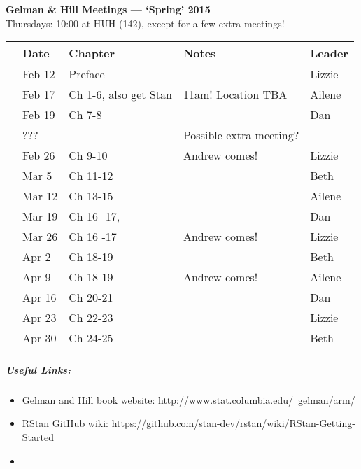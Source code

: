 \documentclass[11pt]{article}
\begin{document}
 
\raggedright
{}

\begin{center} 
{\large \textbf{Gelman \& Hill Meetings --- `Spring' 2015}} \\ [2pt]
Thursdays: 10:00 at HUH (142), except for a few extra meetings!\\
\end{center} 

\begin{center}
\begin{tabular}{ p{0.7 cm}  p{1.5 cm}  p{5 cm}  p{5 cm}  p{1.5 cm} }  \hline \hline
 & \textbf{Date}
   & \textbf{Chapter}
      & \textbf{Notes} 
         & \textbf{Leader} \\ 
\hline \hline
 & Feb 12  &  Preface&        & Lizzie \\\hline
 & Feb 17  & Ch 1-6, also get Stan   &  11am! Location TBA & Ailene  \\\hline
 & Feb 19  & Ch 7-8 &      & Dan \\\hline
 & ???  &  &  Possible extra meeting?     &  \\\hline
 & Feb 26 & Ch 9-10 &  Andrew comes! & Lizzie  \\\hline
 & Mar 5 & Ch 11-12 &        & Beth   \\\hline
 & Mar 12 & Ch 13-15 &  & Ailene \\\hline
 & Mar 19 & Ch 16 -17, &        & Dan \\\hline
 & Mar 26 & Ch 16 -17 &  Andrew comes! & Lizzie  \\\hline
 & Apr 2& Ch 18-19   &  & Beth  \\\hline
 & Apr 9 & Ch 18-19   &  Andrew comes!& Ailene  \\\hline
 & Apr 16 &Ch 20-21 &  & Dan  \\\hline
 & Apr 23 & Ch 22-23       & & Lizzie \\\hline
 & Apr 30& Ch 24-25  & & Beth\\\hline
\hline
\end{tabular}
\end{center}
\subparagraph{Useful Links:} 
\begin{itemize}
\item Gelman and Hill book website: http://www.stat.columbia.edu/~gelman/arm/
\item RStan GitHub wiki: https://github.com/stan-dev/rstan/wiki/RStan-Getting-Started
\item 
\end{itemize}
\end{document}
